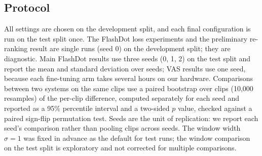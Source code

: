 \subsection{Protocol}
\label{sec:protocol}

All settings are chosen on the development split, and each final configuration is run on the test split once. The FlashDot loss experiments and the preliminary re-ranking result are single runs (seed 0) on the development split; they are diagnostic. Main FlashDot results use three seeds (0, 1, 2) on the test split and report the mean and standard deviation over seeds; VAS results use one seed, because each fine-tuning arm takes several hours on our hardware. Comparisons between two systems on the same clips use a paired bootstrap over clips (10{,}000 resamples) of the per-clip difference, computed separately for each seed and reported as a 95\% percentile interval and a two-sided $p$ value, checked against a paired sign-flip permutation test. Seeds are the unit of replication: we report each seed's comparison rather than pooling clips across seeds. The window width $\sigma = 1$ was fixed in advance as the default for test runs; the window comparison on the test split is exploratory and not corrected for multiple comparisons.
